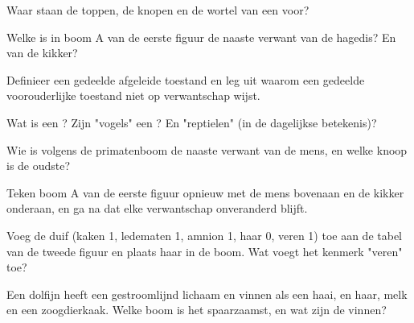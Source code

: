 \begin{exercise}[$\star$]\label{exo:g12:phylogenetic-trees:1}
Waar staan de toppen, de knopen en de wortel van een 
voor?
\end{exercise}

\begin{exercise}[$\star$]\label{exo:g12:phylogenetic-trees:2}
Welke  is in boom A van de eerste figuur de naaste verwant van de
hagedis? En van de kikker?
\end{exercise}

\begin{exercise}[$\star$]\label{exo:g12:phylogenetic-trees:3}
Definieer een gedeelde afgeleide toestand en leg uit waarom een gedeelde
voorouderlijke toestand niet op verwantschap wijst.
\end{exercise}

\begin{exercise}[$\star$]\label{exo:g12:phylogenetic-trees:4}
Wat is een ? Zijn "vogels" een ? En "reptielen" (in de
dagelijkse betekenis)?
\end{exercise}

\begin{exercise}[$\star$]\label{exo:g12:phylogenetic-trees:5}
Wie is volgens de primatenboom de naaste verwant van de mens, en welke
knoop is de oudste?
\end{exercise}

\begin{exercise}[$\star\star$]\label{exo:g12:phylogenetic-trees:6}
Teken boom A van de eerste figuur opnieuw met de mens bovenaan en de
kikker onderaan, en ga na dat elke verwantschap onveranderd blijft.
\end{exercise}

\begin{exercise}[$\star\star$]\label{exo:g12:phylogenetic-trees:7}
Voeg de duif (kaken 1, ledematen 1, amnion 1, haar 0, veren 1) toe aan de
tabel van de tweede figuur en plaats haar in de boom. Wat voegt het
kenmerk "veren" toe?
\end{exercise}

\begin{exercise}[$\star\star$]\label{exo:g12:phylogenetic-trees:8}
Een dolfijn heeft een gestroomlijnd lichaam en vinnen als een haai, en
haar, melk en een zoogdierkaak. Welke boom is het spaarzaamst, en wat zijn
de vinnen?
\end{exercise}

